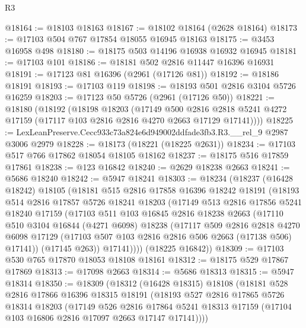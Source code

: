 \begin{lexlean}{R3}
\begin{coremodule}
@18164 := @18103 @18163
@18167 := @18102 @18164 (@2628 @18164)
@18173 := @17103 @504 @767 @17854 @18055 @16945 @18163
@18175 := @3453 @16958 @498
@18180 := @18175 @503 @14196 @16938 @16932 @16945
@18181 := @17103 @101
@18186 := @18181 @502 @2816 @11447 @16396 @16931
@18191 := @17123 @81 @16396 (@2961 (@17126 @81))
@18192 := @18186 @18191
@18193 := @17103 @119
@18198 := @18193 @501 @2816 @3104 @5726 @16259
@18203 := @17123 @50 @5726 (@2961 (@17126 @50))
@18221 := @18180
    (@18192
      (@18198
        @18203
        (@17149
          @500
          @2816
          @2818
          @5241
          @4272
          @17159
          (@17117 @103 @2816 @2816 @4270 @2663 @17129 @17141))))
@18225 := LexLeanPreserve.Cecc933c73a824e6d949002ddfade3fb3.R3.__rel_9 @2987 @3006 @2979
@18228 := @18173 (@18221 (@18225 @2631))
@18234 := @17103 @517 @766 @17862 @18054 @18105 @18162
@18237 := @18175 @516 @17859 @17861
@18238 := @123 @16842
@18240 := @2629 @18238 @2663
@18241 := @5686 @18240
@18242 := @5947 @18241
@18303 := @18234
    (@18237
      (@16428 @18242)
      @18105
      (@18181
        @515
        @2816
        @17858
        @16396
        @18242
        @18191
        (@18193
          @514
          @2816
          @17857
          @5726
          @18241
          @18203
          (@17149
            @513
            @2816
            @17856
            @5241
            @18240
            @17159
            (@17103
              @511
              @103
              @16845
              @2816
              @18238
              @2663
              (@17110
                @510
                @3104
                @16844
                (@4271 @6098)
                @18238
                (@17117
                  @509
                  @2816
                  @2818
                  @4270
                  @6098
                  @17129
                  (@17103 @507 @103 @2816 @2816 @506 @2663 (@17138 @506) @17141))
                (@17145 @263))
              @17141))))
      (@18225 @16842))
@18309 := @17103 @530 @765 @17870 @18053 @18108 @18161
@18312 := @18175 @529 @17867 @17869
@18313 := @17098 @2663
@18314 := @5686 @18313
@18315 := @5947 @18314
@18350 := @18309
    (@18312
      (@16428 @18315)
      @18108
      (@18181
        @528
        @2816
        @17866
        @16396
        @18315
        @18191
        (@18193
          @527
          @2816
          @17865
          @5726
          @18314
          @18203
          (@17149
            @526
            @2816
            @17864
            @5241
            @18313
            @17159
            (@17104 @103 @16806 @2816 @17097 @2663 @17147 @17141))))

\end{coremodule}
\end{lexlean}
